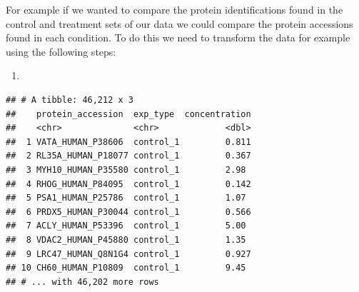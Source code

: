 \documentclass[12pt,]{book}
\newenvironment{Shaded}{\begin{snugshade}}{\end{snugshade}}
\newcommand{\KeywordTok}[1]{\textcolor[rgb]{0.13,0.29,0.53}{\textbf{#1}}}
\newcommand{\DataTypeTok}[1]{\textcolor[rgb]{0.13,0.29,0.53}{#1}}
\newcommand{\StringTok}[1]{\textcolor[rgb]{0.31,0.60,0.02}{#1}}
\newcommand{\CommentTok}[1]{\textcolor[rgb]{0.56,0.35,0.01}{\textit{#1}}}
\newcommand{\OperatorTok}[1]{\textcolor[rgb]{0.81,0.36,0.00}{\textbf{#1}}}
\newcommand{\NormalTok}[1]{#1}
\theoremstyle{definition}
\theoremstyle{definition}
\theoremstyle{definition}
\theoremstyle{remark}
\begin{document}
For example if we wanted to compare the protein identifications found in
the control and treatment sets of our data we could compare the protein
accessions found in each condition. To do this we need to transform the
data for example using the following steps:

\begin{enumerate}
\def\labelenumi{\arabic{enumi}.}
\item
\end{enumerate}

\begin{Shaded}
\end{Shaded}

\begin{verbatim}
## # A tibble: 46,212 x 3
##    protein_accession  exp_type  concentration
##    <chr>              <chr>             <dbl>
##  1 VATA_HUMAN_P38606  control_1         0.811
##  2 RL35A_HUMAN_P18077 control_1         0.367
##  3 MYH10_HUMAN_P35580 control_1         2.98 
##  4 RHOG_HUMAN_P84095  control_1         0.142
##  5 PSA1_HUMAN_P25786  control_1         1.07 
##  6 PRDX5_HUMAN_P30044 control_1         0.566
##  7 ACLY_HUMAN_P53396  control_1         5.00 
##  8 VDAC2_HUMAN_P45880 control_1         1.35 
##  9 LRC47_HUMAN_Q8N1G4 control_1         0.927
## 10 CH60_HUMAN_P10809  control_1         9.45 
## # ... with 46,202 more rows
\end{verbatim}
\end{document}
